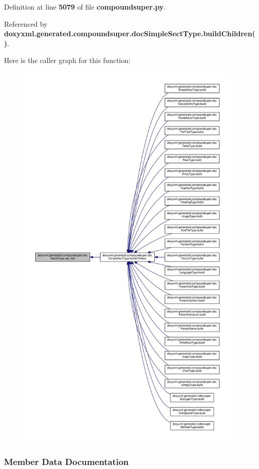 Definition at line {\bf 5079} of file {\bf compoundsuper.\+py}.



Referenced by {\bf doxyxml.\+generated.\+compoundsuper.\+doc\+Simple\+Sect\+Type.\+build\+Children()}.



Here is the caller graph for this function\+:
\nopagebreak
\begin{figure}[H]
\begin{center}
\leavevmode
\includegraphics[height=550pt]{d7/d97/classdoxyxml_1_1generated_1_1compoundsuper_1_1docSect4Type_ab44c9a32c64ca02ec78feec7323134e7_icgraph}
\end{center}
\end{figure}




\subsubsection{Member Data Documentation}

